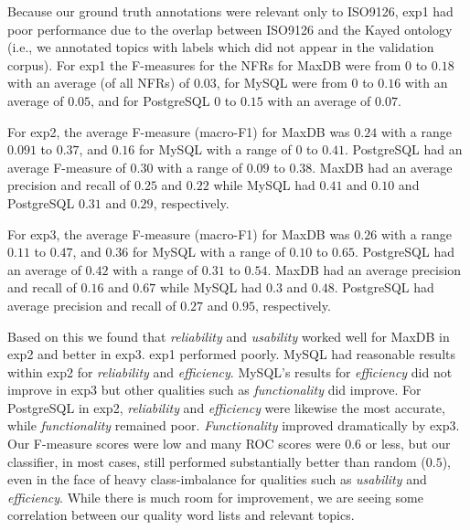 \documentclass[smallextended]{svjour3}       %
\begin{document}
Because our ground truth annotations were relevant only to ISO9126,
 \textsf{exp1} had poor
performance due to the overlap between ISO9126 and the Kayed ontology (i.e., we annotated topics with labels which did not appear in the validation corpus). 
For \textsf{exp1} the F-measures for the NFRs for MaxDB were from $0$ to $0.18$ with an average (of all NFRs)
of $0.03$, for MySQL were from $0$ to $0.16$ with an average of
$0.05$, and for PostgreSQL $0$ to $0.15$ with an average of $0.07$. 




For \textsf{exp2}, the average F-measure (macro-F1) for MaxDB was  $0.24$ with a range $0.091$ to
$0.37$, and $0.16$ for MySQL with a range of $0$ to $0.41$. PostgreSQL had an average F-measure of $0.30$ %
 with a range of $0.09$ to $0.38$.
MaxDB had an average precision and recall of $0.25$ and $0.22$
while MySQL had $0.41$ and $0.10$ and PostgreSQL $0.31$ and $0.29$, respectively.

For \textsf{exp3}, the average F-measure (macro-F1) for MaxDB was $0.26$ with a range $0.11$ to
$0.47$, and $0.36$ for MySQL with a range of $0.10$ to $0.65$. 
PostgreSQL had an average of $0.42$ with a range of $0.31$ to $0.54$.
MaxDB had an average precision and recall of $0.16$ and $0.67$
while MySQL had $0.3$ and $0.48$. PostgreSQL had average precision and recall of $0.27$ and $0.95$, respectively.

Based on this we found that \emph{reliability} and
\emph{usability} worked well for MaxDB in \textsf{exp2} and better in
\textsf{exp3}. 
\textsf{exp1} performed poorly.
MySQL had reasonable results within \textsf{exp2} for \emph{reliability} and \emph{efficiency}. 
MySQL's results for \emph{efficiency} did not improve in \textsf{exp3}
but other qualities such as \emph{functionality} did improve. 
For PostgreSQL in \textsf{exp2}, \emph{reliability} and \emph{efficiency} were likewise the most accurate,
while \emph{functionality} remained poor. \emph{Functionality} improved dramatically by \textsf{exp3}.
Our F-measure scores were low and many ROC scores were $0.6$ or less, but our classifier, in most cases,
still performed substantially better than random ($0.5$), even in the
face of heavy class-imbalance for qualities such as \emph{usability} 
and \emph{efficiency}. While there is much room for improvement, we are seeing some
correlation between our quality word lists and relevant topics.
\end{document}
